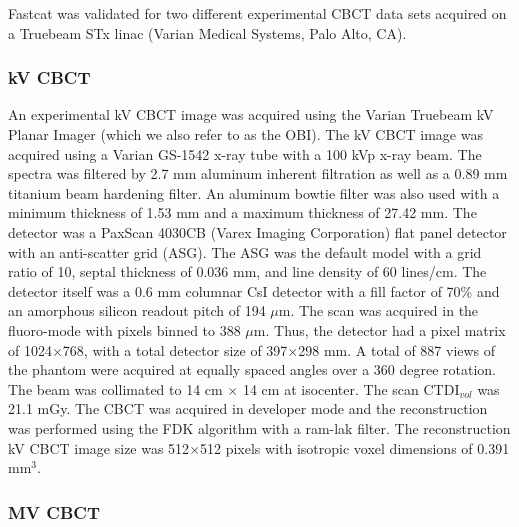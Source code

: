 Fastcat was validated for two different experimental CBCT data sets acquired on a Truebeam STx linac (Varian Medical Systems, Palo Alto, CA).

\subsubsection{kV CBCT}

An experimental kV CBCT image was acquired using the Varian Truebeam kV Planar Imager (which we also refer to as the OBI). The kV CBCT image was acquired using a Varian GS-1542 x-ray tube with a 100 kVp x-ray beam. The spectra was filtered by 2.7 mm aluminum inherent filtration as well as a 0.89 mm titanium beam hardening filter. An aluminum bowtie filter was also used with a minimum thickness of 1.53 mm and a maximum thickness of 27.42 mm. The detector was a PaxScan 4030CB (Varex Imaging Corporation) flat panel detector with an anti-scatter grid (ASG). The ASG was the default model with a grid ratio of 10, septal thickness of 0.036 mm, and line density of 60 lines/cm. The detector itself was a 0.6 mm columnar CsI detector with a fill factor of 70\% and an amorphous silicon readout pitch of 194 $\mu$m. The scan was acquired in the fluoro-mode with pixels binned to 388 $\mu$m. Thus, the detector had a pixel matrix of 1024$\times$768, with a total detector size of 397$\times$298 mm. A total of 887 views of the phantom were acquired at equally spaced angles over a 360 degree rotation. The beam was collimated to 14 cm $\times$ 14 cm at isocenter. The scan CTDI$_{vol}$ was 21.1 mGy. The CBCT was acquired in developer mode and the reconstruction was performed using the FDK algorithm \cite{Feldkamp1984PracticalAlgorithm} with a ram-lak filter. The reconstruction kV CBCT image size was 512$\times$512 pixels with isotropic voxel dimensions of 0.391 mm$^3$.

\subsubsection{MV CBCT}

